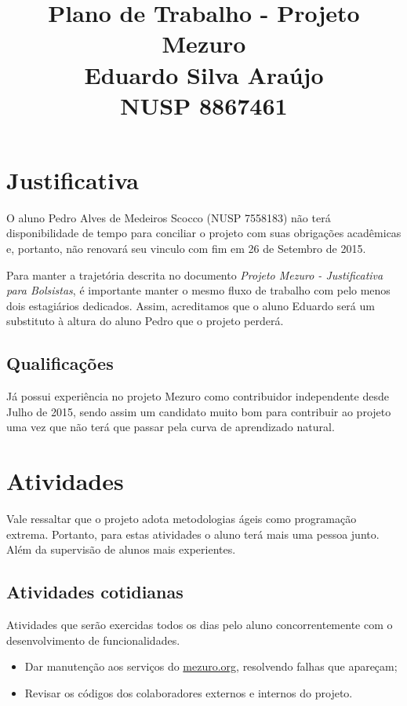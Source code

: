 \documentclass[12pt]{article}
\begin{document}
  \title{Plano de Trabalho - Projeto Mezuro\\
         Eduardo Silva Araújo\\
         NUSP 8867461}

  \maketitle

  \section{Justificativa}
  O aluno Pedro Alves de Medeiros Scocco (NUSP 7558183) não terá disponibilidade de tempo para conciliar o projeto com suas obrigações acadêmicas e, portanto, não renovará seu vinculo com fim em 26 de Setembro de 2015.

  Para manter a trajetória descrita no documento \textit{Projeto Mezuro - Justificativa para Bolsistas}, é importante manter o mesmo fluxo de trabalho com pelo menos dois estagiários dedicados. Assim, acreditamos que o aluno Eduardo será um substituto à altura do aluno Pedro que o projeto perderá.

    \subsection{Qualificações}
    Já possui experiência no projeto Mezuro como contribuidor independente desde Julho de 2015, sendo assim um candidato muito bom para contribuir ao projeto uma vez que não terá que passar pela curva de aprendizado natural.

  \section{Atividades}
    Vale ressaltar que o projeto adota metodologias ágeis como programação extrema. Portanto, para estas atividades o aluno terá mais uma pessoa junto. Além da supervisão de alunos mais experientes.

    \subsection{Atividades cotidianas}
      Atividades que serão exercidas todos os dias pelo aluno concorrentemente com o desenvolvimento de funcionalidades.

      \begin{itemize}
        \item Dar manutenção aos serviços do \url{mezuro.org}, resolvendo falhas que apareçam;
        \item Revisar os códigos dos colaboradores externos e internos do projeto.
      \end{itemize}
\end{document}
